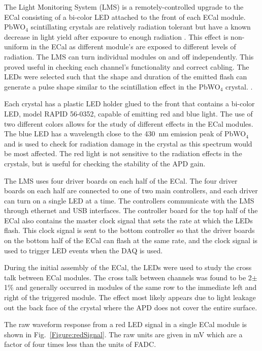 The Light Monitoring System (LMS) is a remotely-controlled upgrade to the ECal consisting of a bi-color LED attached to the front of each ECal module. PbWO$_4$ scintillating crystals are relatively radiation tolerant but have a known decrease in light yield after exposure to enough radiation \cite{Batarin2005543}. This effect is non-uniform in the ECal as different module's are exposed to different levels of radiation. The LMS can turn individual modules on and off independently. This proved useful in checking each channel's functionality and correct cabling. The LEDs were selected such that the shape and duration of the emitted flash can generate a pulse shape similar to the scintillation effect in the PbWO$_4$ crystal. \cite{battaglieri_ft_clas12}.

Each crystal has a plastic LED holder glued to the front that contains a bi-color LED, model RAPID 56-0352, capable of emitting red and blue light. The use of two different colors allows for the study of different effects in the ECal modules. The blue LED has a wavelength close to the 430~nm emission peak of PbWO$_4$  \cite{battaglieri_ft_clas12} and is used to check for radiation damage in the crystal as this spectrum would be most affected. The red light is not sensitive to the radiation effects in the crystals, but is useful for checking the stability of the  APD gain. 

The LMS uses four driver boards on each half of the ECal. The four driver boards on each half are connected to one of two main controllers, and each driver can turn on a single LED at a time. The controllers communicate with the LMS through ethernet and USB interfaces. The controller board for the top half of the ECal also contains the master clock signal that sets the rate at which the LEDs flash. This clock signal is sent to the bottom controller so that the driver boards on the bottom half of the ECal can flash at the same rate, and the clock signal is used to trigger LED events when the DAQ is used. 


During the initial assembly of the ECal, the LEDs were used to study the cross talk between ECal modules. The cross talk between channels was found to be 2$\pm$1$\%$ and generally occurred in modules of the same row to the immediate left and right of the triggered module. The effect most likely appears due to light leakage out the back face of the crystal where the APD does not cover the entire surface.

The raw waveform response from a red LED signal in a single ECal module is shown in Fig.~\ref{Figure:redSignal}. The raw units are given in mV which are a factor of four times less than the units of FADC.


